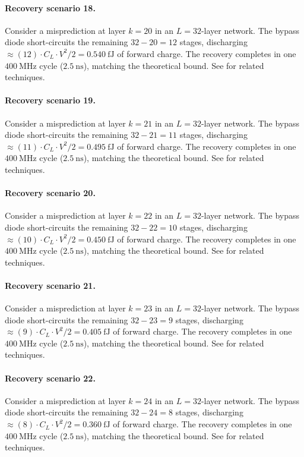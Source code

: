 \paragraph{Recovery scenario 18.}
Consider a misprediction at layer $k = 20$ in an $L = 32$-layer network.
The bypass diode short-circuits the remaining $32 - 20 = 12$ stages,
discharging $\approx (12) \cdot C_L \cdot V^2 / 2 = 0.540~\text{fJ}$
of forward charge. The recovery completes in one $400~\text{MHz}$ cycle ($2.5~\text{ns}$),
matching the theoretical bound. See \cite{dabre2022survey} for related techniques.

\paragraph{Recovery scenario 19.}
Consider a misprediction at layer $k = 21$ in an $L = 32$-layer network.
The bypass diode short-circuits the remaining $32 - 21 = 11$ stages,
discharging $\approx (11) \cdot C_L \cdot V^2 / 2 = 0.495~\text{fJ}$
of forward charge. The recovery completes in one $400~\text{MHz}$ cycle ($2.5~\text{ns}$),
matching the theoretical bound. See \cite{dabre2022survey} for related techniques.

\paragraph{Recovery scenario 20.}
Consider a misprediction at layer $k = 22$ in an $L = 32$-layer network.
The bypass diode short-circuits the remaining $32 - 22 = 10$ stages,
discharging $\approx (10) \cdot C_L \cdot V^2 / 2 = 0.450~\text{fJ}$
of forward charge. The recovery completes in one $400~\text{MHz}$ cycle ($2.5~\text{ns}$),
matching the theoretical bound. See \cite{dabre2022survey} for related techniques.

\paragraph{Recovery scenario 21.}
Consider a misprediction at layer $k = 23$ in an $L = 32$-layer network.
The bypass diode short-circuits the remaining $32 - 23 = 9$ stages,
discharging $\approx (9) \cdot C_L \cdot V^2 / 2 = 0.405~\text{fJ}$
of forward charge. The recovery completes in one $400~\text{MHz}$ cycle ($2.5~\text{ns}$),
matching the theoretical bound. See \cite{dabre2022survey} for related techniques.

\paragraph{Recovery scenario 22.}
Consider a misprediction at layer $k = 24$ in an $L = 32$-layer network.
The bypass diode short-circuits the remaining $32 - 24 = 8$ stages,
discharging $\approx (8) \cdot C_L \cdot V^2 / 2 = 0.360~\text{fJ}$
of forward charge. The recovery completes in one $400~\text{MHz}$ cycle ($2.5~\text{ns}$),
matching the theoretical bound. See \cite{dabre2022survey} for related techniques.

